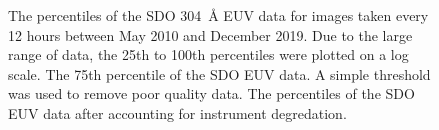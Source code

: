 \documentclass[11pt,a4paper,onecolumn]{report}
\begin{document}
\begin{figure}[t]%
  \qquad
  \qquad

  \caption[]{ The percentiles of the SDO
  \SI{304}{\angstrom} EUV data for images taken every 12 hours between May 2010
  and December 2019. Due to the large range of data, the 25th to 100th
  percentiles were plotted on a log scale.  The 75th
  percentile of the SDO EUV data. A simple threshold was used to remove poor
  quality data.  The percentiles of the SDO
  EUV data after accounting for instrument degredation.}
  \label{fig:aia_data_prep}
\end{figure}
\end{document}
